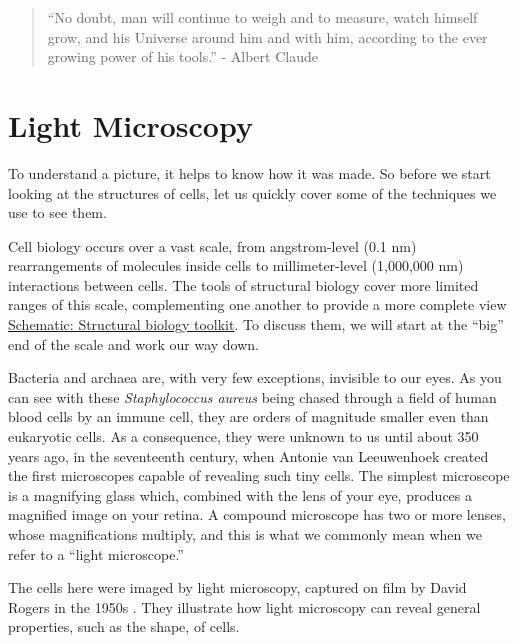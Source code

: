 \documentclass[]{tufte-book}
\begin{document}
\begin{quote}
``No doubt, man will continue to weigh and to measure, watch himself
grow, and his Universe around him and with him, according to the ever
growing power of his tools.'' - Albert Claude \citep{claude1974}
\end{quote}

\section{Light Microscopy}\label{light-microscopy}

To understand a picture, it helps to know how it was made. So before we
start looking at the structures of cells, let us quickly cover some of
the techniques we use to see them.

Cell biology occurs over a vast scale, from angstrom-level (0.1 nm)
rearrangements of molecules inside cells to millimeter-level (1,000,000
nm) interactions between cells. The tools of structural biology cover
more limited ranges of this scale, complementing one another to provide
a more complete view
\protect\hyperlink{Structural_biology_toolkit}{Schematic: Structural
biology toolkit}. To discuss them, we will start at the ``big'' end of
the scale and work our way down.

Bacteria and archaea are, with very few exceptions, invisible to our
eyes. As you can see with these \emph{Staphylococcus aureus} being
chased through a field of human blood cells by an immune cell, they are
orders of magnitude smaller even than eukaryotic cells. As a
consequence, they were unknown to us until about 350 years ago, in the
seventeenth century, when Antonie van Leeuwenhoek created the first
microscopes capable of revealing such tiny cells. The simplest
microscope is a magnifying glass which, combined with the lens of your
eye, produces a magnified image on your retina. A compound microscope
has two or more lenses, whose magnifications multiply, and this is what
we commonly mean when we refer to a ``light microscope.''

The cells here were imaged by light microscopy, captured on film by
David Rogers in the 1950s \citep{hillInternet}. They illustrate how
light microscopy can reveal general properties, such as the shape, of
cells.
\end{document}
